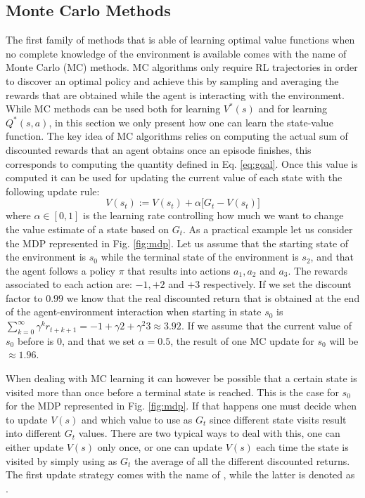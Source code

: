 \subsection{Monte Carlo Methods}
The first family of methods that is able of learning optimal value functions when no complete knowledge of the environment is available comes with the name of Monte Carlo (MC) methods. MC algorithms only require RL trajectories in order to discover an optimal policy and achieve this by sampling and averaging the rewards that are obtained while the agent is interacting with the environment. While MC methods can be used both for learning $V^{*}(s)$ and for learning $Q^{*}(s,a)$, in this section we only present how one can learn the state-value function. The key idea of MC algorithms relies on computing the actual sum of discounted rewards that an agent obtains once an episode finishes, this corresponds to computing the quantity defined in Eq. \ref{eq:goal}. Once this value is computed it can be used for updating the current value of each state with the following update rule: 
\begin{equation}
	V(s_t) := V(s_t) + \alpha \big[G_t - V(s_t) \big]
\label{eq:mc_update}
\end{equation}
where $\alpha \in [0,1]$ is the learning rate controlling how much we want to change the value estimate of a state based on $G_t$. As a practical example let us consider the MDP represented in Fig. \ref{fig:mdp}. Let us assume that the starting state of the environment is $s_0$ while the terminal state of the environment is $s_2$, and that the agent follows a policy $\pi$ that results into actions $a_1, a_2$ and $a_3$. The rewards associated to each action are: $-1, +2$ and $+3$ respectively. If we set the discount factor to $0.99$ we know that the real discounted return that is obtained at the end of the agent-environment interaction when starting in state $s_0$ is $\sum_{k=0}^{\infty}\gamma^{k} r_{t+k+1} = -1+\gamma2+\gamma^{2}3 \approx 3.92$. If we assume that the current value of $s_0$ before is $0$, and that we set $\alpha=0.5$, the result of one MC update for $s_0$ will be $\approx 1.96$.    

When dealing with MC learning it can however be possible that a certain state is visited more than once before a terminal state is reached. This is the case for $s_0$ for the MDP represented in Fig. \ref{fig:mdp}. If that happens one must decide when to update $V(s)$ and which value to use as $G_t$ since different state visits result into different $G_t$ values. There are two typical ways to deal with this, one can either update $V(s)$ only once, or one can update $V(s)$ each time the state is visited by simply using as $G_t$ the average of all the different discounted returns. The first update strategy comes with the name of , while the latter is denoted as .


